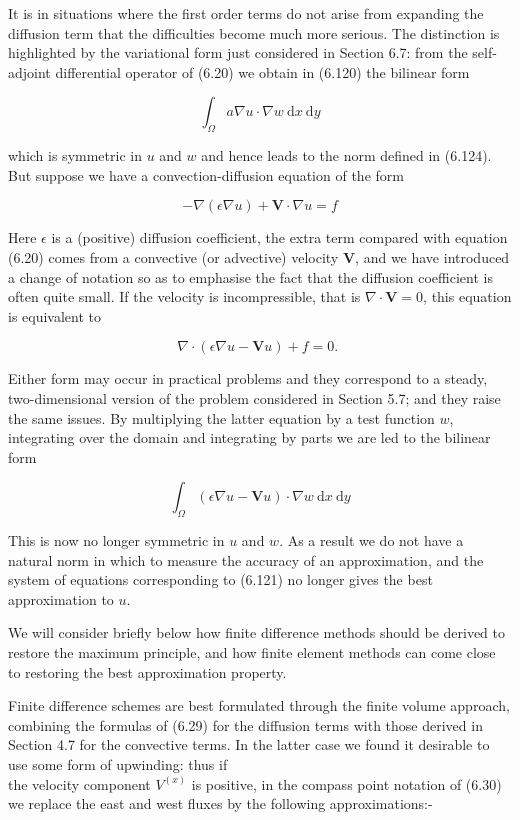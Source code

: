 \documentclass[10pt]{article}
\begin{document}
It is in situations where the first order terms do not arise from expanding the diffusion term that the difficulties become much more serious. The distinction is highlighted by the variational form just considered in Section 6.7: from the self-adjoint differential operator of (6.20) we obtain in (6.120) the bilinear form

\[
\int_{\Omega} a \nabla u \cdot \nabla w \mathrm{~d} x \mathrm{~d} y
\]

which is symmetric in \(u\) and \(w\) and hence leads to the norm defined in (6.124). But suppose we have a convection-diffusion equation of the form

\[
-\nabla(\epsilon \nabla u)+\mathbf{V} \cdot \nabla u=f
\]

Here \(\epsilon\) is a (positive) diffusion coefficient, the extra term compared with equation (6.20) comes from a convective (or advective) velocity \(\mathbf{V}\), and we have introduced a change of notation so as to emphasise the fact that the diffusion coefficient is often quite small. If the velocity is incompressible, that is \(\nabla \cdot \mathbf{V}=0\), this equation is equivalent to

\[
\nabla \cdot(\epsilon \nabla u-\mathbf{V} u)+f=0 \text {. }
\]

Either form may occur in practical problems and they correspond to a steady, two-dimensional version of the problem considered in Section 5.7; and they raise the same issues. By multiplying the latter equation by a test function \(w\), integrating over the domain and integrating by parts we are led to the bilinear form

\[
\int_{\Omega}(\epsilon \nabla u-\mathbf{V} u) \cdot \nabla w \mathrm{~d} x \mathrm{~d} y
\]

This is now no longer symmetric in \(u\) and \(w\). As a result we do not have a natural norm in which to measure the accuracy of an approximation, and the system of equations corresponding to (6.121) no longer gives the best approximation to \(u\).

We will consider briefly below how finite difference methods should be derived to restore the maximum principle, and how finite element methods can come close to restoring the best approximation property.

Finite difference schemes are best formulated through the finite volume approach, combining the formulas of (6.29) for the diffusion terms with those derived in Section 4.7 for the convective terms. In the latter case we found it desirable to use some form of upwinding: thus if\\
the velocity component \(V^{(x)}\) is positive, in the compass point notation of (6.30) we replace the east and west fluxes by the following approximations:-
\end{document}
